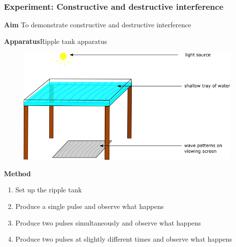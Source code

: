 \label{m38802*eip-791}
            \subsubsection{ Experiment: Constructive and destructive interference}
            \nopagebreak
            \label{m38802*eip-260}\noindent{}\textbf{Aim}
To demonstrate constructive and destructive interference
\par 
\label{m38802*eip7241}\noindent{}\textbf{Apparatus}Ripple tank apparatus

    \setcounter{subfigure}{0}


	\begin{figure}[H] %
    \begin{center}
    \label{m38802*id63458!!!underscore!!!media}\label{m38802*id63458!!!underscore!!!printimage}\includegraphics{col11305.imgs/m38802_rippletray.png} %
        
      \vspace{2pt}
    \vspace{.1in}
    
    \end{center}

 \end{figure}   

    \addtocounter{footnote}{-0}
    \par 
\label{m38802*eip7474}\noindent{}\textbf{Method}
\label{m38802*id6242}\begin{enumerate}[noitemsep, label=\textbf{\arabic*}. ] 
            \item Set up the ripple tank\item Produce a single pulse and observe what happens\item Produce two pulses simultaneously and observe what happens\item Produce two pulses at slightly different times and observe what happens\end{enumerate}
        
